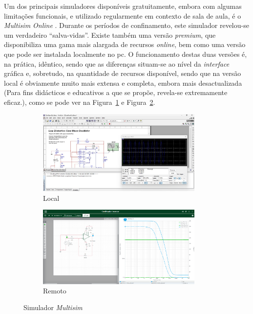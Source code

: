 Um dos principais simuladores disponíveis gratuitamente, embora com algumas limitações funcionais, e utilizado regularmente em contexto de sala de aula, é o \textit{Multisim Online} \cite{multisim}. Durante os períodos de confinamento, este simulador revelou-se um verdadeiro ``salva-vidas''. Existe também uma versão \textit{premium}, que disponibiliza uma gama mais alargada de recursos \textit{online}, bem como uma versão que pode ser instalada localmente no \acrshort{pc}. O funcionamento destas duas versões é, na prática, idêntico, sendo que as diferenças situam-se ao nível da \textit{interface} gráfica e, sobretudo, na quantidade de recursos disponível, sendo que na versão local é obviamente muito mais extensa e completa, embora mais desactualizada (Para fins didácticos e educativos a que se propõe, revela-se extremamente eficaz.), como se pode ver na Figura~\ref{fig:multisimlocal} e Figura~\ref{fig:multisimremoto}.

\begin{figure}[hbtp]
    \centering
    \begin{subfigure}[hbtp]{0.48\textwidth}
        \centering
        \includegraphics[width=0.9\textwidth]{figures/Multisim_Desktop.png}
        \caption{Local}
        \label{fig:multisimlocal}
    \end{subfigure}
    \begin{subfigure}[hbtp]{0.48\textwidth}
        \includegraphics[width=0.9\textwidth]{figures/Multisim_ACsweep.png}
        \caption{Remoto}
        \label{fig:multisimremoto}
    \end{subfigure}
    \caption{Simulador \textit{Multisim}}
    \label{fig:multisimsimulator}
\end{figure}

